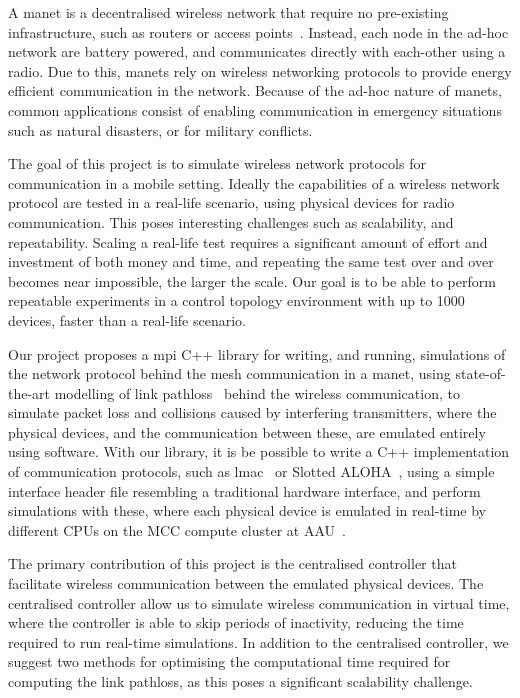 
A \gls{manet} is a decentralised wireless network that require no pre-existing infrastructure, such as routers or access points~\cite{inproceedings:routingsurvery}. Instead, each node in the ad-hoc network are battery powered, and communicates directly with each-other using a radio. Due to this, \gls{manet}s rely on wireless networking protocols to provide energy efficient communication in the network. Because of the ad-hoc nature of \gls{manet}s, common applications consist of enabling communication in emergency situations such as natural disasters, or for military conflicts.\smallbreak

The goal of this project is to simulate wireless network protocols for communication in a mobile setting. Ideally the capabilities of a wireless network protocol are tested in a real-life scenario, using physical devices for radio communication. This poses interesting challenges such as scalability, and repeatability. Scaling a real-life test requires a significant amount of effort and investment of both money and time, and repeating the same test over and over becomes near impossible, the larger the scale. Our goal is to be able to perform repeatable experiments in a control topology environment with up to 1000 devices, faster than a real-life scenario.\smallbreak

Our project proposes a \gls{mpi} C++ library for writing, and running, simulations of the network protocol behind the mesh communication in a \gls{manet}, using state-of-the-art modelling of link \gls{pathloss}~\cite{paper:linkmodel} behind the wireless communication, to simulate packet loss and collisions caused by interfering transmitters, where the physical devices, and the communication between these, are emulated entirely using software. With our library, it is be possible to write a C++ implementation of communication protocols, such as \gls{lmac}~\cite{paper:lmac_protocol} or Slotted ALOHA~\cite{Roberts:1975:APS:1024916.1024920}, using a simple interface header file resembling a traditional hardware interface, and perform simulations with these, where each physical device is emulated in real-time by different CPUs on the MCC compute cluster at AAU~\cite{website:mccaau}. \smallbreak

The primary contribution of this project is the centralised controller that facilitate wireless communication between the emulated physical devices. The centralised controller allow us to simulate wireless communication in virtual time, where the controller is able to skip periods of inactivity, reducing the time required to run real-time simulations. In addition to the centralised controller, we suggest two methods for optimising the computational time required for computing the link \gls{pathloss}, as this poses a significant scalability challenge.

\newpage